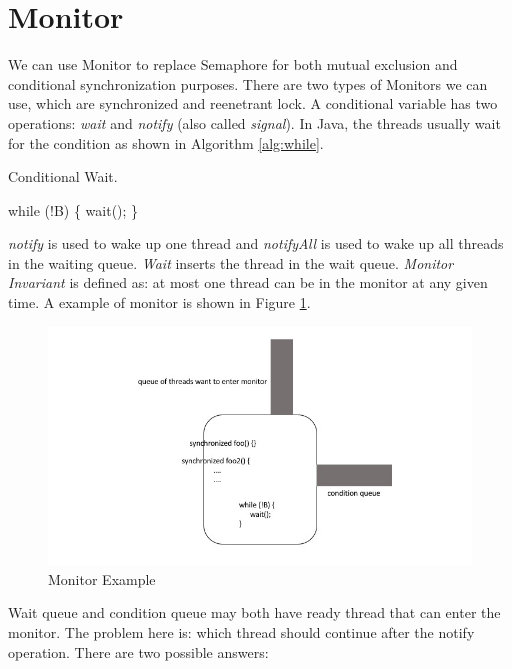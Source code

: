 \documentclass[twoside]{article}
\begin{document}
\section{Monitor}
We can use Monitor to replace Semaphore for both mutual exclusion and conditional synchronization purposes. There are two types of Monitors we can use, which are synchronized and reenetrant lock. A conditional variable has two operations: \textit{wait} and \textit{notify} (also called \textit{signal}). In Java, the threads usually wait for the condition as shown in Algorithm \ref{alg:while}.
\begin{algorithm}
\caption{Conditional Wait.}
\begin{algorithmic}[1]
\State while (!B) \{
\State \indent wait();
\State \} 
\end{algorithmic}
\label{alg:while}
\end{algorithm}
\newline
\textit{notify} is used to wake up one thread and \textit{notifyAll} is used to wake up all threads in the waiting queue. \textit{Wait} inserts the thread in the wait queue. 
\newline
\textit{Monitor Invariant} is defined as: at most one thread can be in the monitor at any given time. A example of monitor is shown in Figure \ref{fig:monitor}.

\begin{figure}[ht]
  \centering
  \includegraphics[height=0.250\textheight,width=1.0\linewidth]{./monitor.jpg} 
  \caption{Monitor Example}
  \label{fig:monitor}
\end{figure}

Wait queue and condition queue may both have ready thread that can enter the monitor. The problem here is: which thread should continue after the notify operation. There are two possible answers:
\end{document}
